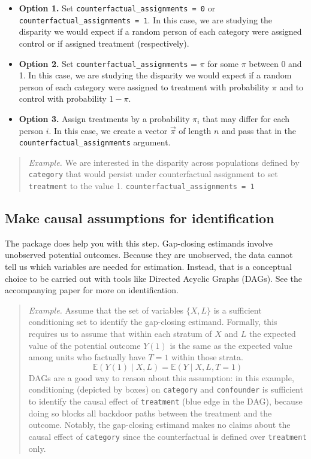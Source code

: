 \documentclass[
]{article}
\providecommand{\tightlist}{%
  \setlength{\itemsep}{0pt}\setlength{\parskip}{0pt}}
\begin{document}
\begin{itemize}
\tightlist
\item
  \textbf{Option 1.} Set \texttt{counterfactual\_assignments\ =\ 0} or \texttt{counterfactual\_assignments\ =\ 1}. In this case, we are studying the disparity we would expect if a random person of each category were assigned control or if assigned treatment (respectively).
\item
  \textbf{Option 2.} Set \texttt{counterfactual\_assignments} = \(\pi\) for some \(\pi\) between 0 and 1. In this case, we are studying the disparity we would expect if a random person of each category were assigned to treatment with probability \(\pi\) and to control with probability \(1 - \pi\).
\item
  \textbf{Option 3.} Assign treatments by a probability \(\pi_i\) that may differ for each person \(i\). In this case, we create a vector \(\vec\pi\) of length \(n\) and pass that in the \texttt{counterfactual\_assignments} argument.
\end{itemize}

\begin{quote}
\emph{Example.} We are interested in the disparity across populations defined by \texttt{category} that would persist under counterfactual assignment to set \texttt{treatment} to the value 1.
\texttt{counterfactual\_assignments\ =\ 1}
\end{quote}

\hypertarget{make-causal-assumptions-for-identification}{%
\subsection{Make causal assumptions for identification}\label{make-causal-assumptions-for-identification}}

The package does help you with this step. Gap-closing estimands involve unobserved potential outcomes. Because they are unobserved, the data cannot tell us which variables are needed for estimation. Instead, that is a conceptual choice to be carried out with tools like Directed Acyclic Graphs (DAGs). See the accompanying \citet{lundberg2021} paper for more on identification.

\begin{quote}
\emph{Example.} Assume that the set of variables \(\{X,L\}\) is a sufficient conditioning set to identify the gap-closing estimand. Formally, this requires us to assume that within each stratum of \(X\) and \(L\) the expected value of the potential outcome \(Y(1)\) is the same as the expected value among units who factually have \(T = 1\) within those strata.
\[\mathbb{E}(Y(1)\mid X, L) = \mathbb{E}(Y\mid X, L, T = 1)\]
DAGs are a good way to reason about this assumption: in this example, conditioning (depicted by boxes) on \texttt{category} and \texttt{confounder} is sufficient to identify the causal effect of \texttt{treatment} (blue edge in the DAG), because doing so blocks all backdoor paths between the treatment and the outcome. Notably, the gap-closing estimand makes no claims about the causal effect of \texttt{category} since the counterfactual is defined over \texttt{treatment} only.
\end{quote}
\end{document}
